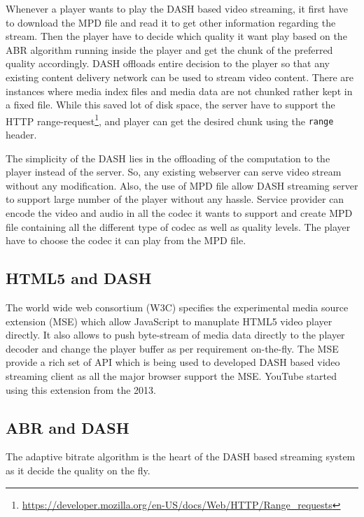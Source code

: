 Whenever a player wants to play the DASH based video streaming, it first have to download the MPD file and read it to get other information regarding the stream. Then the player have to decide which quality it want play based on the ABR algorithm running inside the player and get the chunk of the preferred quality accordingly. DASH offloads entire decision to the player so that any existing content delivery network can be used to stream video content. There are instances where media index files and media data are not chunked rather kept in a fixed file. While this saved lot of disk space, the server have to support the HTTP range-request\footnote{\url{https://developer.mozilla.org/en-US/docs/Web/HTTP/Range_requests}}, and player can get the desired chunk using the {\tt range} header.

The simplicity of the DASH lies in the offloading of the computation to the player instead of the server. So, any existing webserver can serve video stream without any modification. Also, the use of MPD file allow DASH streaming server to support large number of the player without any hassle. Service provider can encode the video and audio in all the codec it wants to support and create MPD file containing all the different type of codec as well as quality levels. The player have to choose the codec it can play from the MPD file.

\subsection{HTML5 and DASH}
The world wide web consortium (W3C) specifies the experimental media source extension (MSE) which allow JavaScript to manuplate HTML5 video player directly. It also allows to push byte-stream of media data directly to the player decoder and change the player buffer as per requirement on-the-fly. The MSE provide a rich set of API which is being used to developed DASH based video streaming client as all the major browser support the MSE. YouTube started using this extension from the 2013.

\subsection{ABR and DASH}
The adaptive bitrate algorithm is the heart of the DASH based streaming system as it decide the quality on the fly.